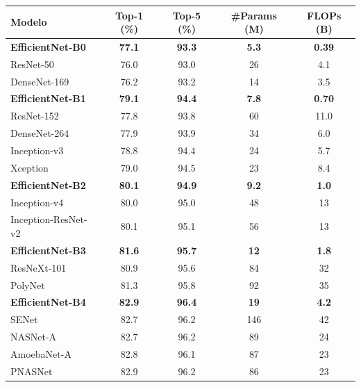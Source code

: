 \begin{table}[htbp]
	\centering
	\begin{tabular}{lcccc}
		\toprule
		\textbf{Modelo} & \textbf{Top-1 (\%)} & \textbf{Top-5 (\%)} & \textbf{\#Params (M)} & \textbf{FLOPs (B)} \\
		\midrule
		
		\textbf{EfficientNet-B0} & \textbf{77.1} & \textbf{93.3} & \textbf{5.3} & \textbf{0.39} \\
		ResNet-50                & 76.0 & 93.0 & 26  & 4.1 \\
		DenseNet-169             & 76.2 & 93.2 & 14  & 3.5 \\
		
		\midrule
		\textbf{EfficientNet-B1} & \textbf{79.1} & \textbf{94.4} & \textbf{7.8} & \textbf{0.70} \\
		ResNet-152               & 77.8 & 93.8 & 60  & 11.0 \\
		DenseNet-264             & 77.9 & 93.9 & 34  & 6.0 \\
		Inception-v3             & 78.8 & 94.4 & 24  & 5.7 \\
		Xception                 & 79.0 & 94.5 & 23  & 8.4 \\
		
		\midrule
		\textbf{EfficientNet-B2} & \textbf{80.1} & \textbf{94.9} & \textbf{9.2} & \textbf{1.0} \\
		Inception-v4             & 80.0 & 95.0 & 48  & 13 \\
		Inception-ResNet-v2      & 80.1 & 95.1 & 56  & 13 \\
		
		\midrule
		\textbf{EfficientNet-B3} & \textbf{81.6} & \textbf{95.7} & \textbf{12} & \textbf{1.8} \\
		ResNeXt-101              & 80.9 & 95.6 & 84  & 32 \\
		PolyNet                  & 81.3 & 95.8 & 92  & 35 \\
		
		\midrule
		\textbf{EfficientNet-B4} & \textbf{82.9} & \textbf{96.4} & \textbf{19} & \textbf{4.2} \\
		SENet                    & 82.7 & 96.2 & 146 & 42 \\
		NASNet-A                 & 82.7 & 96.2 & 89  & 24 \\
		AmoebaNet-A              & 82.8 & 96.1 & 87  & 23 \\
		PNASNet                  & 82.9 & 96.2 & 86  & 23 \\
		

\end{tabular}
\end{table}
